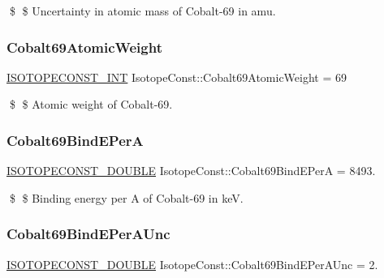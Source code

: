 \$ \$ Uncertainty in atomic mass of Cobalt-\/69 in amu. \mbox{\label{group___isotope_const-_cobalt-_co69_ga024617ca5677237e40a33a227cd3101e}} 
\subsubsection{\texorpdfstring{Cobalt69\+Atomic\+Weight}{Cobalt69AtomicWeight}}
{\footnotesize\ttfamily \mbox{\hyperlink{group___isotope_const-_macros_ga5f18360b3e99483a35c32d789e62621c}{I\+S\+O\+T\+O\+P\+E\+C\+O\+N\+S\+T\+\_\+\+I\+NT}} Isotope\+Const\+::\+Cobalt69\+Atomic\+Weight = 69}

\$ \$ Atomic weight of Cobalt-\/69. \mbox{\label{group___isotope_const-_cobalt-_co69_ga9ba0163c049013f8770bdceb7e435e5f}} 
\subsubsection{\texorpdfstring{Cobalt69\+Bind\+E\+PerA}{Cobalt69BindEPerA}}
{\footnotesize\ttfamily \mbox{\hyperlink{group___isotope_const-_macros_ga8f45a7272ce02c0b4c65c44636ed719a}{I\+S\+O\+T\+O\+P\+E\+C\+O\+N\+S\+T\+\_\+\+D\+O\+U\+B\+LE}} Isotope\+Const\+::\+Cobalt69\+Bind\+E\+PerA = 8493.}

\$ \$ Binding energy per A of Cobalt-\/69 in keV. \mbox{\label{group___isotope_const-_cobalt-_co69_ga1c7371a5daa5b4eedf4e0c4fad2dffb1}} 
\subsubsection{\texorpdfstring{Cobalt69\+Bind\+E\+Per\+A\+Unc}{Cobalt69BindEPerAUnc}}
{\footnotesize\ttfamily \mbox{\hyperlink{group___isotope_const-_macros_ga8f45a7272ce02c0b4c65c44636ed719a}{I\+S\+O\+T\+O\+P\+E\+C\+O\+N\+S\+T\+\_\+\+D\+O\+U\+B\+LE}} Isotope\+Const\+::\+Cobalt69\+Bind\+E\+Per\+A\+Unc = 2.}

